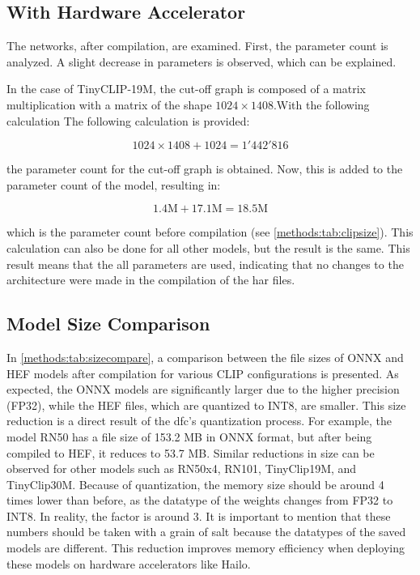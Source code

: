 \subsection{With Hardware Accelerator}

The networks, after compilation, are examined. First, the parameter count is analyzed.
A slight decrease in parameters is observed, which can be explained.

In the case of TinyCLIP-19M, the cut-off graph is composed of a matrix multiplication with a matrix of the shape \(1024 \times 1408\).With the following calculation
The following calculation is provided:

\begin{equation*}
    1024 \times 1408 + 1024 = 1'442'816
\end{equation*}

the parameter count for the cut-off graph is obtained. Now, this is added to the parameter count of the model, resulting in:

\begin{equation*}
    1.4 \text{M} + 17.1 \text{M} = 18.5 \text{M} 
\end{equation*}

which is the parameter count before compilation (see \cref{methods:tab:clipsize}).
This calculation can also be done for all other models, but the result is the same.
This result means that the all parameters are used, indicating that no changes to the architecture were made in the compilation of the \acrshort{har} files.


\subsection{Model Size Comparison}

In \cref{methods:tab:sizecompare}, a comparison between the file sizes of ONNX and HEF models after compilation for various CLIP configurations is presented.
As expected, the ONNX models are significantly larger due to the higher precision (FP32), while the HEF files, which are quantized to INT8, are smaller.
This size reduction is a direct result of the \acrshort{dfc}'s quantization process.
For example, the model RN50 has a file size of 153.2 MB in ONNX format, but after being compiled to HEF, it reduces to 53.7 MB.
Similar reductions in size can be observed for other models such as RN50x4, RN101, TinyClip19M, and TinyClip30M.
Because of quantization, the memory size should be around 4 times lower than before, as the datatype of the weights changes from FP32 to INT8.
In reality, the factor is around 3.
It is important to mention that these numbers should be taken with a grain of salt because the datatypes of the saved models are different.
This reduction improves memory efficiency when deploying these models on hardware accelerators like Hailo.

